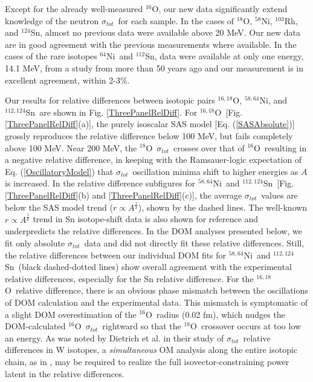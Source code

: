 \documentclass[twocolumn,secnumarabic,amssymb, nobibnotes, aps, prl,
superscriptaddress, nobalancelastpage, floatfix]{revtex4}
\newcommand{\tot}{\ensuremath{\sigma_{tot}}}
\newcommand{\oSix}{\ensuremath{^{16}}O}
\newcommand{\oEight}{\ensuremath{^{18}}O}
\newcommand{\oSixEight}{\ensuremath{^{16,18}}O}
\newcommand{\niEight}{\ensuremath{^{58}}N\lowercase{i}}
\newcommand{\niFour}{\ensuremath{^{64}}N\lowercase{i}}
\newcommand{\niEightFour}{\ensuremath{^{58,64}}N\lowercase{i}}
\newcommand{\rhThree}{\ensuremath{^{103}}R\lowercase{h}}
\newcommand{\snTwelve}{\ensuremath{^{112}}S\lowercase{n}}
\newcommand{\snFour}{\ensuremath{^{124}}S\lowercase{n}}
\newcommand{\snTwelveFour}{\ensuremath{^{112,124}}S\lowercase{n}}
\begin{document}
Except for the already well-measured \oSix, our new data significantly
extend knowledge of the neutron \tot\ for each sample. In the cases of \oEight,
\niEight, \rhThree, and \snFour, almost no previous data were available
above 20 MeV. Our new data are in good agreement with the previous
measurements where available. In the cases of the rare isotopes \niFour\ and \snTwelve,
data were available at only one energy, 14.1 MeV, from a study from more than 50
years ago \cite{Dukarevich1967} and our measurement is in excellent agreement, within 2-3\%.

Our results for relative differences between isotopic pairs \oSixEight,
\niEightFour, and \snTwelveFour\ are shown in Fig. \ref{ThreePanelRelDiff}. For
\oSixEight\ [Fig. \ref{ThreePanelRelDiff}(a)], the purely isoscalar
SAS model [Eq. (\ref{SASAbsolute})] grossly reproduces the relative
difference below 100 MeV, but fails completely above 100 MeV. Near 200
MeV, the \oEight\ \tot\ crosses over that of \oSix\ resulting in a negative
relative difference, in keeping with the Ramsauer-logic expectation of Eq.
(\ref{OscillatoryModel}) that \tot\ oscillation minima shift to higher
energies as $A$ is increased. In the relative difference subfigures for 
\niEightFour\ and \snTwelveFour\ [Fig. \ref{ThreePanelRelDiff}(b) and \ref{ThreePanelRelDiff}(c)],
the average \tot\ values are below the
SAS model trend ($r \propto A^{\frac{1}{3}}$), shown by the dashed lines. 
The well-known $r \propto A^{\frac{1}{6}}$ trend in Sn isotope-shift data 
\cite{Anselment1986} is also shown for reference and
underpredicts the relative differences. In the DOM analyses presented below, we fit only
absolute \tot\ data and did not directly fit these relative 
differences. Still, the relative differences between our individual DOM fits for
\niEightFour\ and \snTwelveFour\ (black dashed-dotted lines) show overall agreement
with the experimental relative differences, especially for the Sn relative difference. For the
\oSixEight\ relative difference, there is an obvious phase mismatch between the oscillations of DOM calculation
and the experimental data. This mismatch is symptomatic of a slight DOM overestimation of the \oSix\
radius (0.02 fm), which nudges the DOM-calculated \oSix\ \tot\ rightward so that the \oEight\
crossover occurs at too low an energy. As was noted by Dietrich et al. in
their study of \tot\ relative differences in W isotopes, a \textit{simultaneous} OM
analysis along the entire isotopic chain, as in \cite{Mueller2011},
may be required to realize the full isovector-constraining power latent in the relative differences.
\end{document}
